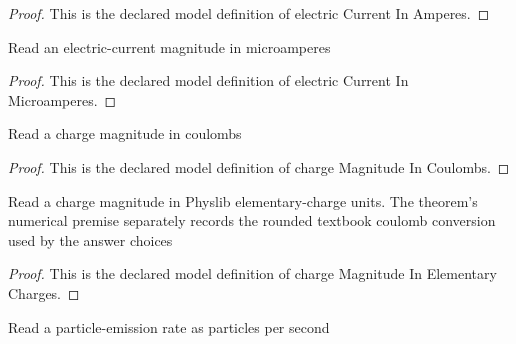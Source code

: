 \begin{proof}
  This is the declared model definition of electric Current In Amperes.
\end{proof}
\begin{definition}
  \label{def:physics:phyx-mini-0642:phyxminiproblems-problemphyxmini0642-electriccurrentinmicroamperes}
  Read an electric-current magnitude in microamperes
\end{definition}
\begin{proof}
  This is the declared model definition of electric Current In Microamperes.
\end{proof}
\begin{definition}
  \label{def:physics:phyx-mini-0642:phyxminiproblems-problemphyxmini0642-chargemagnitudeincoulombs}
  Read a charge magnitude in coulombs
\end{definition}
\begin{proof}
  This is the declared model definition of charge Magnitude In Coulombs.
\end{proof}
\begin{definition}
  \label{def:physics:phyx-mini-0642:phyxminiproblems-problemphyxmini0642-chargemagnitudeinelementarycharges}
  Read a charge magnitude in Physlib elementary-charge units. The theorem's numerical premise separately records the rounded textbook coulomb conversion used by the answer choices
\end{definition}
\begin{proof}
  This is the declared model definition of charge Magnitude In Elementary Charges.
\end{proof}
\begin{definition}
  \label{def:physics:phyx-mini-0642:phyxminiproblems-problemphyxmini0642-particleratepersecond}
  Read a particle-emission rate as particles per second
\end{definition}
